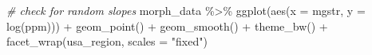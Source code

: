 \documentclass[
  11pt,
]{article}
\newenvironment{Shaded}{\begin{snugshade}}{\end{snugshade}}
\newcommand{\AttributeTok}[1]{\textcolor[rgb]{0.77,0.63,0.00}{#1}}
\newcommand{\CommentTok}[1]{\textcolor[rgb]{0.56,0.35,0.01}{\textit{#1}}}
\newcommand{\FunctionTok}[1]{\textcolor[rgb]{0.00,0.00,0.00}{#1}}
\newcommand{\NormalTok}[1]{#1}
\newcommand{\SpecialCharTok}[1]{\textcolor[rgb]{0.00,0.00,0.00}{#1}}
\newcommand{\StringTok}[1]{\textcolor[rgb]{0.31,0.60,0.02}{#1}}
\begin{document}
\begin{Shaded}
\begin{Highlighting}[]
\CommentTok{\# check for random slopes}
\NormalTok{morph\_data }\SpecialCharTok{\%\textgreater{}\%} \FunctionTok{ggplot}\NormalTok{(}\FunctionTok{aes}\NormalTok{(}\AttributeTok{x =}\NormalTok{ mgstr, }\AttributeTok{y =} \FunctionTok{log}\NormalTok{(ppm))) }\SpecialCharTok{+}
  \FunctionTok{geom\_point}\NormalTok{() }\SpecialCharTok{+}
  \FunctionTok{geom\_smooth}\NormalTok{() }\SpecialCharTok{+}
  \FunctionTok{theme\_bw}\NormalTok{() }\SpecialCharTok{+}
  \FunctionTok{facet\_wrap}\NormalTok{(}\StringTok{\textquotesingle{}usa\_region\textquotesingle{}}\NormalTok{, }\AttributeTok{scales =} \StringTok{"fixed"}\NormalTok{)}
\end{Highlighting}
\end{Shaded}
\end{document}

